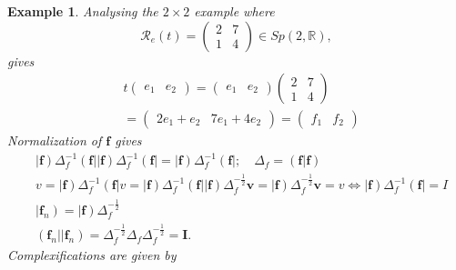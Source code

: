 \documentclass[aps,preprint]{revtex4}
\newtheorem{example}[theorem]{Example}
\begin{document}
\begin{example}
Analysing the $2\times 2$ example where 
\begin{equation}
\mathcal{R}_{e}\left( t\right) =\left( 
\begin{array}{cc}
2 & 7 \\ 
1 & 4%
\end{array}%
\right) \in Sp\left( 2,\mathbb{R}\right) ,
\end{equation}%
gives%
\begin{align}
& t\left( 
\begin{array}{cc}
e_{1} & e_{2}%
\end{array}%
\right) =\left( 
\begin{array}{cc}
e_{1} & e_{2}%
\end{array}%
\right) \left( 
\begin{array}{cc}
2 & 7 \\ 
1 & 4%
\end{array}%
\right) \\
& =\left( 
\begin{array}{cc}
2e_{1}+e_{2} & 7e_{1}+4e_{2}%
\end{array}%
\right) =\left( 
\begin{array}{cc}
f_{1} & f_{2}%
\end{array}%
\right)
\end{align}%
Normalization of $\mathbf{f}$ gives 
\begin{align}
& \left\vert \mathbf{f}\right) \Delta _{f}^{-1}\left( \mathbf{f}\right\vert
\left\vert \mathbf{f}\right) \Delta _{f}^{-1}\left( \mathbf{f}\right\vert
=\left\vert \mathbf{f}\right) \Delta _{f}^{-1}\left( \mathbf{f}\right\vert
;\quad \Delta _{f}=\left( \left. \mathbf{f}\right\vert \mathbf{f}\right) \\
& v=\left\vert \mathbf{f}\right) \Delta _{f}^{-1}\left( \mathbf{f}%
\right\vert v=\left\vert \mathbf{f}\right) \Delta _{f}^{-1}\left( \mathbf{f}%
\right\vert \left\vert \mathbf{f}\right) \Delta _{f}^{-\frac{1}{2}}\mathbf{v}%
=\left\vert \mathbf{f}\right) \Delta _{f}^{-\frac{1}{2}}\mathbf{v}%
=v\Leftrightarrow \left\vert \mathbf{f}\right) \Delta _{f}^{-1}\left( 
\mathbf{f}\right\vert =I \\
& \left\vert \mathbf{f}_{n}\right) =\left\vert \mathbf{f}\right) \Delta
_{f}^{-\frac{1}{2}} \\
& \left( \mathbf{f}_{n}\right\vert \left\vert \mathbf{f}_{n}\right) =\Delta
_{f}^{-\frac{1}{2}}\Delta _{f}\Delta _{f}^{-\frac{1}{2}}=\mathbf{I.}
\end{align}%
Complexifications are given by 

\end{example}
\end{document}
